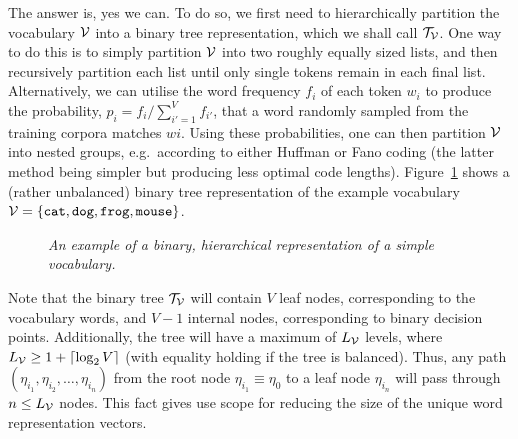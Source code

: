 \documentclass[a4paper]{article}
\begin{document}
The answer is, yes we can. To do so, we first need to hierarchically partition the vocabulary ${\cal V}$ into 
a binary tree representation, which we shall call ${\cal T}_{\cal V}$. 
One way to do this is to simply partition ${\cal V}$ into two roughly equally sized lists, and then
recursively partition each list until only single tokens remain in each final list.
Alternatively, we can utilise the word frequency $f_i$ of each token $w_i$ to produce the probability,
$p_i=f_i/\sum_{i'=1}^V f_{i'}$, that a word randomly sampled from the training corpora matches $wi$.
Using these probabilities, one can then partition ${\cal V}$ into nested groups, e.g.\ according to
either Huffman or Fano coding (the latter method being simpler but producing less optimal code lengths).
Figure~\ref{fig:catdog} shows a (rather unbalanced) binary tree representation of the example vocabulary 
${\cal V} = \{{\tt cat},{\tt dog},{\tt frog},{\tt mouse}\}$.
\begin{figure}[hbt]
\centering
{}
\caption{\em An example of a binary, hierarchical representation of a simple vocabulary.}
\label{fig:catdog}
\end{figure}

Note that the binary tree ${\cal T}_{\cal V}$ will contain $V$ leaf nodes, corresponding to the vocabulary words, and
$V-1$ internal nodes, corresponding to binary decision points. 
Additionally, the tree will have a maximum of $L_{\cal V}$ levels, where
$L_{\cal V}\ge 1+\lceil\log_2 V\rceil$ (with equality holding if the tree is balanced).
Thus, any path $(\eta_{i_1},\eta_{i_2},\ldots,\eta_{i_n})$ 
from the root node $\eta_{i_1}\equiv\eta_{0}$ to a leaf node $\eta_{i_n}$ will pass through $n \le L_{\cal V}$ nodes.
This fact gives use scope for reducing the size of the unique word representation vectors.
\end{document}

